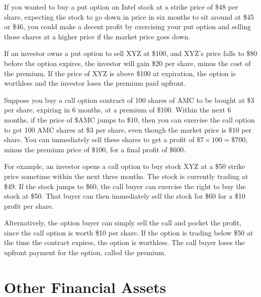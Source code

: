 \documentclass{article}
\begin{document}
    \begin{example}
      If you wanted to buy a put option on Intel stock at a strike price of \$48 per share, expecting the stock to go down in price in six months to sit around at \$45 or \$46, you could make a decent profit by exercising your put option and selling those shares at a higher price if the market price goes down. 
    \end{example}

    \begin{example}
      If an investor owns a put option to sell XYZ at \$100, and XYZ’s price falls to \$80 before the option expires, the investor will gain \$20 per share, minus the cost of the premium. If the price of XYZ is above \$100 at expiration, the option is worthless and the investor loses the premium paid upfront.
    \end{example}

    \begin{example}
      Suppose you buy a call option contract of 100 shares of AMC to be bought at \$3 per share, expiring in 6 months, at a premium of \$100. Within the next 6 months, if the price of \$AMC jumps to \$10, then you can exercise the call option to get 100 AMC shares at \$3 per share, even though the market price is $\$10$ per share. You can immediately sell these shares to get a profit of $\$7 \times 100 = \$700$, minus the premium price of $\$100$, for a final profit of $\$600$. 
    \end{example}

    \begin{example}
      For example, an investor opens a call option to buy stock XYZ at a \$50 strike price sometime within the next three months. The stock is currently trading at \$49. If the stock jumps to \$60, the call buyer can exercise the right to buy the stock at \$50. That buyer can then immediately sell the stock for \$60 for a \$10 profit per share. 
          
      Alternatively, the option buyer can simply sell the call and pocket the profit, since the call option is worth \$10 per share. If the option is trading below \$50 at the time the contract expires, the option is worthless. The call buyer loses the upfront payment for the option, called the premium.
    \end{example}

\section{Other Financial Assets}
\end{document}
